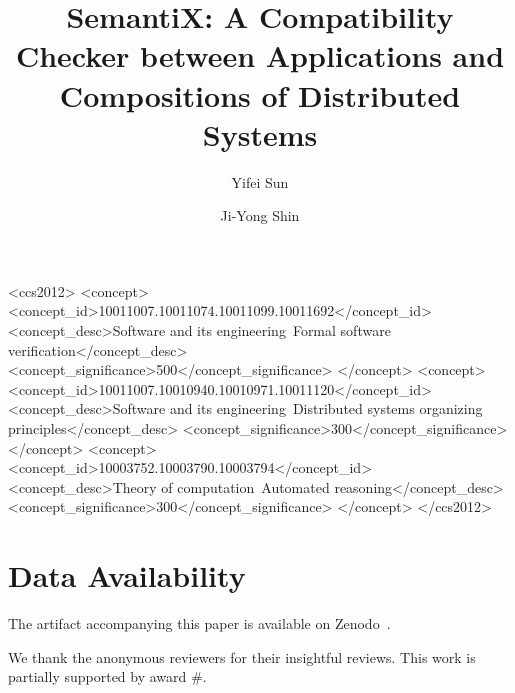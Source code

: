 \documentclass[acmsmall]{acmart}
\begin{document}
\title{SemantiX: A Compatibility Checker between Applications and Compositions of Distributed Systems}

\author{Yifei Sun}

\author{Ji-Yong Shin}


\begin{abstract}
  
\end{abstract}

\begin{CCSXML}
<ccs2012>
<concept>
<concept_id>10011007.10011074.10011099.10011692</concept_id>
<concept_desc>Software and its engineering~Formal software verification</concept_desc>
<concept_significance>500</concept_significance>
</concept>
<concept>
<concept_id>10011007.10010940.10010971.10011120</concept_id>
<concept_desc>Software and its engineering~Distributed systems organizing principles</concept_desc>
<concept_significance>300</concept_significance>
</concept>
<concept>
<concept_id>10003752.10003790.10003794</concept_id>
<concept_desc>Theory of computation~Automated reasoning</concept_desc>
<concept_significance>300</concept_significance>
</concept>
</ccs2012>
\end{CCSXML}



\maketitle










\section*{Data Availability}
The artifact accompanying this paper is available on Zenodo~\cite{ourartifact}.

\begin{acks}
We thank the anonymous reviewers for their insightful reviews. This work is partially supported by  award \#.
\end{acks}



\end{document}
